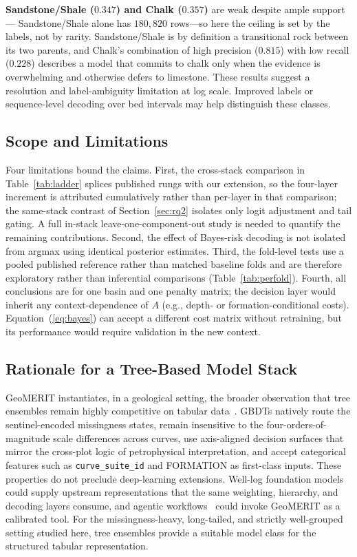 \documentclass[bdcc,article,submit,pdftex,moreauthors]{Definitions/mdpi}
\begin{document}
\textbf{Sandstone/Shale ($0.347$) and Chalk ($0.357$)} are weak despite ample support---
Sandstone/Shale alone has $180{,}820$ rows---so here the ceiling is set by the labels, not by
rarity. Sandstone/Shale is by definition a transitional rock between its two parents, and
Chalk's combination of high precision ($0.815$) with low recall ($0.228$) describes a model
that commits to chalk only when the evidence is overwhelming and otherwise defers to limestone.
These results suggest a resolution and label-ambiguity limitation at log scale. Improved
labels or sequence-level decoding over bed intervals may help distinguish these classes.

\subsection{Scope and Limitations}
\label{sec:limits}
Four limitations bound the claims. First, the cross-stack comparison in
Table~\ref{tab:ladder} splices published rungs with our extension, so the four-layer
increment is attributed cumulatively rather than per-layer in that comparison; the
same-stack contrast of Section~\ref{sec:rq2} isolates only logit adjustment and tail gating.
A full in-stack leave-one-component-out study is needed to quantify the remaining
contributions. Second, the effect of Bayes-risk decoding is not isolated from argmax using
identical posterior estimates. Third, the fold-level tests use a pooled published reference
rather than matched baseline folds and are therefore exploratory rather than inferential
comparisons (Table~\ref{tab:perfold}). Fourth, all conclusions are for one basin and one
penalty matrix; the decision layer would inherit any context-dependence of $A$ (e.g., depth-
or formation-conditional costs). Equation~(\ref{eq:bayes}) can accept a different cost matrix
without retraining, but its performance would require validation in the new context.

\subsection{Rationale for a Tree-Based Model Stack}
\label{sec:trees}
GeoMERIT instantiates, in a geological setting, the broader observation that tree ensembles
remain highly competitive on tabular
data~\cite{grinsztajn2022trees,shwartzziv2022tabular,mcelfresh2024benchmark}. GBDTs natively
route the sentinel-encoded missingness states, remain insensitive to the
four-orders-of-magnitude scale differences across curves, use axis-aligned decision surfaces
that mirror the cross-plot logic of petrophysical interpretation, and accept categorical
features such as \texttt{curve\_suite\_id} and FORMATION as first-class inputs. These
properties do not preclude deep-learning extensions. Well-log foundation
models~\cite{qi2025wlfm} could supply
upstream representations that the same weighting, hierarchy, and decoding layers consume,
and agentic workflows~\cite{wang2026geodecider} could invoke GeoMERIT as a calibrated
tool. For the missingness-heavy, long-tailed, and strictly well-grouped setting studied here,
tree ensembles provide a suitable model class for the structured tabular representation.
\end{document}
